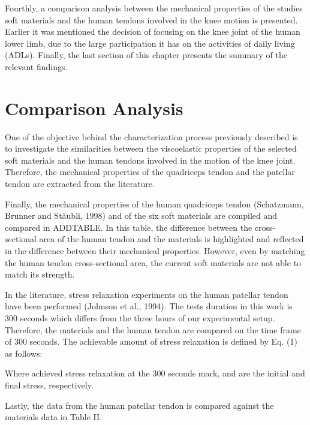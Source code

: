 Fourthly, a comparison analysis between the mechanical properties of the studies soft materials and the human tendons involved in the knee motion is presented. Earlier it was mentioned the decision of focusing on the knee joint of the human lower limb, due to the large participation it has on the activities of daily living (ADLs). Finally, the last section of this chapter presents the summary of the relevant findings.


\section{Comparison Analysis}

One of the objective behind the characterization process previously described is to investigate the similarities between the viscoelastic properties of the selected soft materials and the human tendons involved in the motion of the knee joint. Therefore, the mechanical properties of the quadriceps tendon and the patellar tendon are extracted from the literature.



Finally, the mechanical properties of the human quadriceps tendon (Schatzmann, Brunner and St{\"a}ubli, 1998) and of the six soft materials are compiled and compared in ADDTABLE. In this table, the difference between the cross-sectional area of the human tendon and the materials is highlighted and reflected in the difference between their mechanical properties. However, even by matching the human tendon cross-sectional area, the current soft materials are not able to match its strength.

In the literature, stress relaxation experiments on the human patellar tendon have been performed (Johnson et al., 1994). The tests duration in this work is 300 seconds which differs from the three hours of our experimental setup. Therefore, the materials and the human tendon are compared on the time frame of 300 seconds. The achievable amount of stress relaxation is defined by Eq. (1) as follows:

Where achieved stress relaxation at the 300 seconds mark,  and  are the initial and final stress, respectively. 

Lastly, the data from the human patellar tendon is compared against the materials data in Table II.

